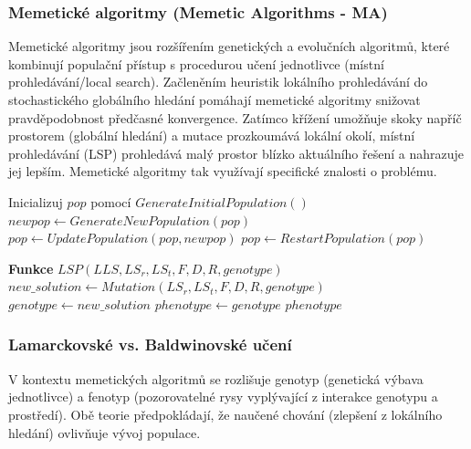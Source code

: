 \documentclass[12pt,a4paper]{article}
\theoremstyle{definition}
\begin{document}
\subsubsection{Memetické algoritmy (Memetic Algorithms - MA)}
Memetické algoritmy jsou rozšířením genetických a evolučních algoritmů, které kombinují populační přístup s procedurou učení jednotlivce (místní prohledávání/local search). Začleněním heuristik lokálního prohledávání do stochastického globálního hledání pomáhají memetické algoritmy snižovat pravděpodobnost předčasné konvergence. Zatímco křížení umožňuje skoky napříč prostorem (globální hledání) a mutace prozkoumává lokální okolí, místní prohledávání (LSP) prohledává malý prostor blízko aktuálního řešení a nahrazuje jej lepším. Memetické algoritmy tak využívají specifické znalosti o problému.

\begin{algorithm}[H]
\caption{Population-Based Search Engine (Základní šablona MA)}
\begin{algorithmic}[1]
\STATE Inicializuj $pop$ pomocí $GenerateInitialPopulation()$
\REPEAT
\STATE $newpop \gets GenerateNewPopulation(pop)$
\STATE $pop \gets UpdatePopulation(pop, newpop)$
\STATE $pop \gets RestartPopulation(pop)$
\ENDIF
{}
\end{algorithmic}
\end{algorithm}

\begin{algorithm}[H]
\caption{Local search procedure (Procedura místního hledání v MA)}
\begin{algorithmic}[1]
\STATE \textbf{Funkce} $LSP(LLS, LS_r, LS_t, F, D, R, genotype)$
\STATE $new\_solution \gets Mutation(LS_r, LS_t, F, D, R, genotype)$
\STATE $genotype \gets new\_solution$
\ENDIF
\ENDFOR
\STATE $phenotype \gets genotype$
\RETURN $phenotype$
\end{algorithmic}
\end{algorithm}

\subsubsection{Lamarckovské vs. Baldwinovské učení}
V kontextu memetických algoritmů se rozlišuje genotyp (genetická výbava jednotlivce) a fenotyp (pozorovatelné rysy vyplývající z interakce genotypu a prostředí). Obě teorie předpokládají, že naučené chování (zlepšení z lokálního hledání) ovlivňuje vývoj populace.
\end{document}
